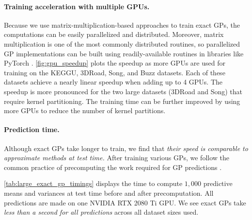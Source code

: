 \paragraph{Training acceleration with multiple GPUs.}
Because we use matrix-multiplication-based approaches to train exact GPs, the computations can be easily parallelized and distributed.
Moreover, matrix multiplication is one of the most commonly distributed routines, so parallelized GP implementations can be built using readily-available routines in libraries like PyTorch \citep{paszke2017automatic}.
\autoref{fig:gpu_speedup} plots the speedup as more GPUs are used for training on the KEGGU, 3DRoad, Song, and Buzz datasets.
Each of these datasets achieve a nearly linear speedup when adding up to 4 GPUs.
The speedup is more pronounced for the two large datasets (3DRoad and Song) that require kernel partitioning.
The training time can be further improved by using more GPUs to reduce the number of kernel partitions.

\paragraph{Prediction time.}
Although exact GPs take longer to train, we find that \emph{their speed is comparable to approximate methods at test time.}
After training various GPs, we follow the common practice of precomputing the work required for GP predictions \citep{pleiss2018constant}.

\autoref{tab:large_exact_gp_timings} displays the time to compute $1,\!000$ predictive means and variances at test time before and after precomputation.
All predictions are made on one NVIDIA RTX 2080 Ti GPU. We see exact GPs take \emph{less than a second for all predictions} across all
dataset sizes used.
%
